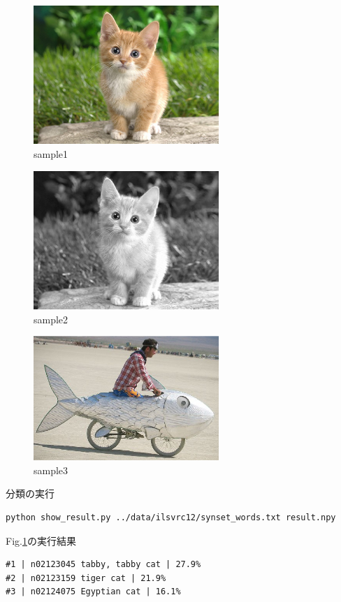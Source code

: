 \documentclass[a4paper,10pt]{jsarticle}
\begin{document}
\begin{figure}[b]
 \centering
    \includegraphics[width=70mm]{../02nd/fig/cat.eps}
   \caption{sample1}
	 \label{cat}
\end{figure}
\begin{figure}[b]
 \centering
    \includegraphics[width=70mm]{../02nd/fig/cat_gray.eps}
 \caption{sample2}	 
 \label{cat_gray}
\end{figure}
\begin{figure}[b]
 \centering
    \includegraphics[width=70mm]{../02nd/fig/fish-bike.eps}
 \caption{sample3}
 \label{fish_bike}
\end{figure}

分類の実行
\begin{lstlisting}[basicstyle=\ttfamily\footnotesize, frame=single]
python show_result.py ../data/ilsvrc12/synset_words.txt result.npy
\end{lstlisting}

Fig.\ref{cat}の実行結果
\begin{lstlisting}[basicstyle=\ttfamily\footnotesize, frame=single]
#1 | n02123045 tabby, tabby cat | 27.9%
#2 | n02123159 tiger cat | 21.9%
#3 | n02124075 Egyptian cat | 16.1%
\end{lstlisting}
\end{document}
